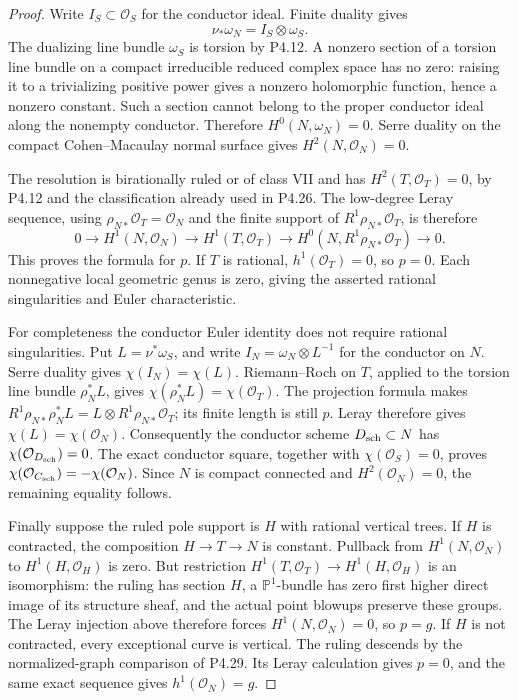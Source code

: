 \begin{proof}
Write $I_S\subset\mathcal O_S$ for the conductor ideal.
Finite duality gives
\[
 \nu_*\omega_N=I_S\otimes\omega_S.
\]
The dualizing line bundle $\omega_S$ is torsion by P4.12.
A nonzero section of a torsion line bundle on a compact
irreducible reduced complex space has no zero: raising it
to a trivializing positive power gives a nonzero holomorphic
function, hence a nonzero constant. Such a section cannot
belong to the proper conductor ideal along the nonempty
conductor. Therefore $H^0(N,\omega_N)=0$. Serre duality
on the compact Cohen--Macaulay normal surface gives
$H^2(N,\mathcal O_N)=0$.

The resolution is birationally ruled or of class VII and
has $H^2(T,\mathcal O_T)=0$, by P4.12 and the classification
already used in P4.26. The low-degree Leray sequence,
using $\rho_{N*}\mathcal O_T=\mathcal O_N$ and the
finite support of $R^1\rho_{N*}\mathcal O_T$, is therefore
\[
 0\longrightarrow H^1(N,\mathcal O_N)
 \longrightarrow H^1(T,\mathcal O_T)
 \longrightarrow H^0(N,R^1\rho_{N*}\mathcal O_T)
 \longrightarrow0.
\]
This proves the formula for $p$. If $T$ is rational,
$h^1(\mathcal O_T)=0$, so $p=0$. Each nonnegative local
geometric genus is zero, giving the asserted rational
singularities and Euler characteristic.

For completeness the conductor Euler identity does not
require rational singularities. Put $L=\nu^*\omega_S$,
and write $I_N=\omega_N\otimes L^{-1}$ for the conductor
on $N$. Serre duality gives $\chi(I_N)=\chi(L)$.
Riemann--Roch on $T$, applied to the torsion line bundle
$\rho_N^*L$, gives
$\chi(\rho_N^*L)=\chi(\mathcal O_T)$.
The projection formula makes
$R^1\rho_{N*}\rho_N^*L=L\otimes R^1\rho_{N*}\mathcal O_T$;
its finite length is still $p$. Leray therefore gives
$\chi(L)=\chi(\mathcal O_N)$.
Consequently the conductor scheme $D_{\rm sch}\subset N$
has $\chi(\mathcal O_{D_{\rm sch}})=0$.
The exact conductor square, together with
$\chi(\mathcal O_S)=0$, proves
$\chi(\mathcal O_{C_{\rm sch}})=-\chi(\mathcal O_N)$.
Since $N$ is compact connected and $H^2(\mathcal O_N)=0$,
the remaining equality follows.

Finally suppose the ruled pole support is $H$ with
rational vertical trees. If $H$ is contracted, the
composition $H\to T\to N$ is constant. Pullback from
$H^1(N,\mathcal O_N)$ to $H^1(H,\mathcal O_H)$ is zero.
But restriction
$H^1(T,\mathcal O_T)\to H^1(H,\mathcal O_H)$ is an
isomorphism: the ruling has section $H$, a
$\mathbb P^1$-bundle has zero first higher direct image
of its structure sheaf, and the actual point blowups
preserve these groups. The Leray injection above
therefore forces $H^1(N,\mathcal O_N)=0$, so $p=g$.
If $H$ is not contracted, every exceptional curve is
vertical. The ruling descends by the normalized-graph
comparison of P4.29. Its Leray calculation gives $p=0$,
and the same exact sequence gives $h^1(\mathcal O_N)=g$.
\end{proof}
